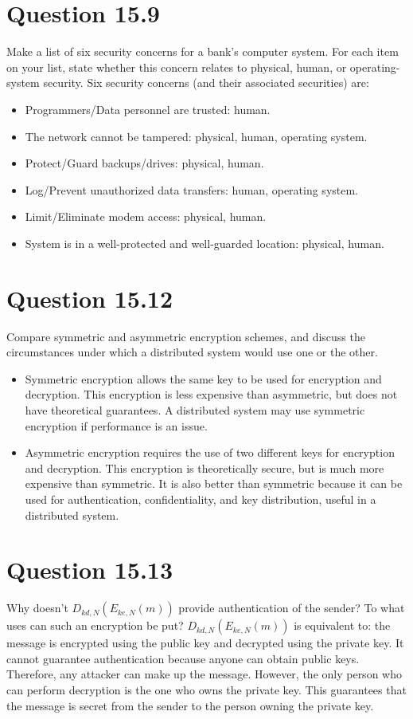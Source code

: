 \documentclass[12pt]{article}
\begin{document}
\section*{Question 15.9} {\color{blue}Make a list of six security concerns for a bank’s computer system. For each item on your list, state whether this concern relates to physical, human, or operating-system security.
}
Six security concerns (and their associated securities) are:
\begin{itemize}
\item Programmers/Data personnel are trusted: human.
\item The network cannot be tampered: physical, human, operating system.
\item Protect/Guard backups/drives: physical, human.
\item Log/Prevent unauthorized data transfers: human, operating system.
\item Limit/Eliminate modem access: physical, human.
\item System is in a well-protected and well-guarded location: physical, human.
\end{itemize}

\section*{Question 15.12} {\color{blue}Compare symmetric and asymmetric encryption schemes, and discuss the circumstances under which a distributed system would use one or the other.
} 
\begin{itemize}
\item Symmetric encryption allows the same key to be used for encryption and decryption. This encryption is less expensive than asymmetric, but does not have theoretical guarantees. A distributed system may use symmetric encryption if performance is an issue. 
\item Asymmetric encryption requires the use of two different keys for encryption and decryption. This encryption is theoretically secure, but is much more expensive than symmetric. It is also better than symmetric because it can be used for authentication, confidentiality, and key distribution, useful in a distributed system. 
\end{itemize}



\section*{Question 15.13} {\color{blue}Why doesn't $D_{kd,N}(E_{ke,N}(m))$ provide authentication of the sender? To what uses can such an encryption be put?
} $D_{kd,N}(E_{ke,N}(m))$ is equivalent to: the message is encrypted using the public key and decrypted using the private key. It cannot guarantee authentication because anyone can obtain public keys. Therefore, any attacker can make up the message. However, the only person who can perform decryption is the one who owns the private key. This guarantees that the message is secret from the sender to the person owning the private key.
\end{document}
